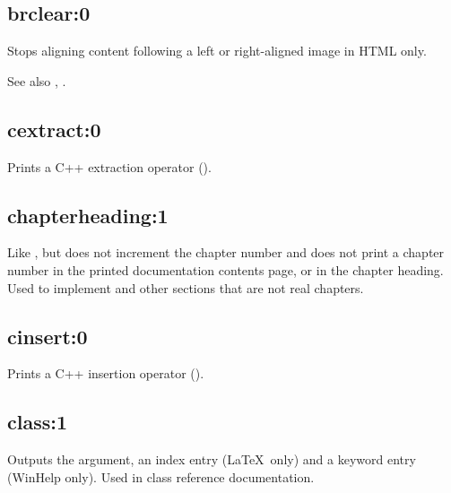 
\subsection*{brclear:0}\label{brclear}

Stops aligning content following a left or right-aligned image in HTML only.

See also , .

\subsection*{cextract:0}\label{cextract}

Prints a C++ extraction operator (\cextract).

\subsection*{chapterheading:1}\label{chapterheading}

Like , but does not increment the chapter
number and does not print a chapter number in the printed documentation
contents page, or in the chapter heading. Used to implement  and
other sections that are not real chapters.

\subsection*{cinsert:0}\label{cinsert}

Prints a C++ insertion operator (\cinsert).

\subsection*{class:1}\label{class}

Outputs the argument, an index entry (\LaTeX\ only) and a keyword entry (WinHelp only).
Used in class reference documentation.

